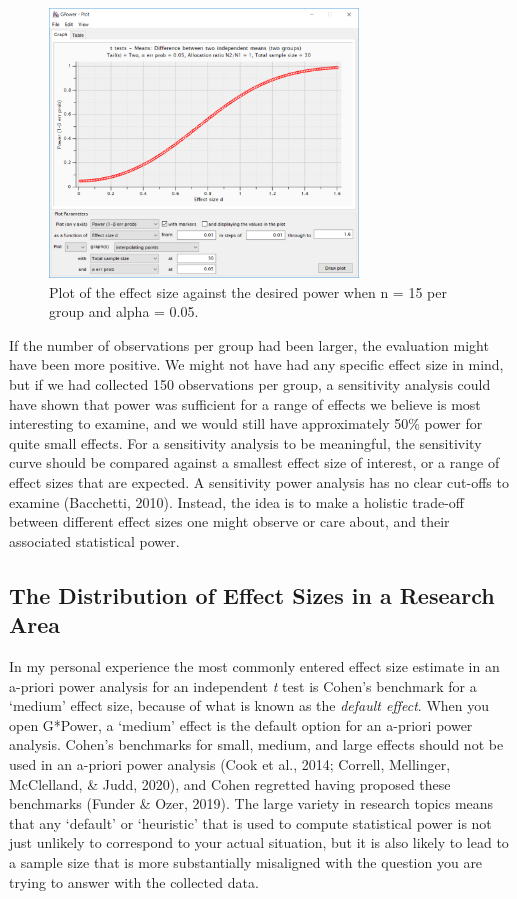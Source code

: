 \documentclass[
  english,
  ,jou,floatsintext]{apa6}
\begin{document}
\begin{figure}
\includegraphics[width=3.23in]{images/sensitivity1} \caption{Plot of the effect size against the desired power when n = 15 per group and alpha = 0.05.}\label{fig:gsens1}
\end{figure}

If the number of observations per group had been larger, the evaluation might have been more positive. We might not have had any specific effect size in mind, but if we had collected 150 observations per group, a sensitivity analysis could have shown that power was sufficient for a range of effects we believe is most interesting to examine, and we would still have approximately 50\% power for quite small effects. For a sensitivity analysis to be meaningful, the sensitivity curve should be compared against a smallest effect size of interest, or a range of effect sizes that are expected. A sensitivity power analysis has no clear cut-offs to examine (Bacchetti, 2010). Instead, the idea is to make a holistic trade-off between different effect sizes one might observe or care about, and their associated statistical power.

\hypertarget{the-distribution-of-effect-sizes-in-a-research-area}{%
\subsection{The Distribution of Effect Sizes in a Research Area}\label{the-distribution-of-effect-sizes-in-a-research-area}}

In my personal experience the most commonly entered effect size estimate in an a-priori power analysis for an independent \emph{t} test is Cohen's benchmark for a `medium' effect size, because of what is known as the \emph{default effect}. When you open G*Power, a `medium' effect is the default option for an a-priori power analysis. Cohen's benchmarks for small, medium, and large effects should not be used in an a-priori power analysis (Cook et al., 2014; Correll, Mellinger, McClelland, \& Judd, 2020), and Cohen regretted having proposed these benchmarks (Funder \& Ozer, 2019). The large variety in research topics means that any `default' or `heuristic' that is used to compute statistical power is not just unlikely to correspond to your actual situation, but it is also likely to lead to a sample size that is more substantially misaligned with the question you are trying to answer with the collected data.
\end{document}

